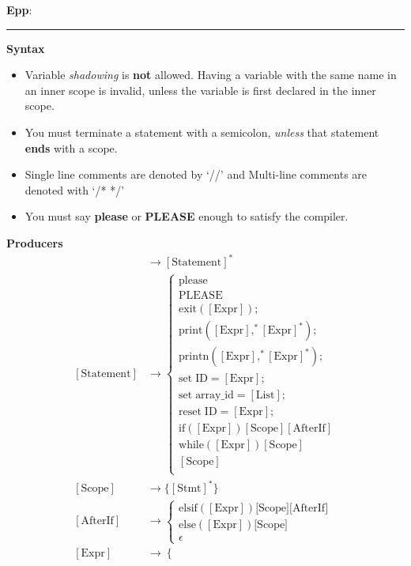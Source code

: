 \documentclass[11pt]{article}
\newcommand{\hwheadings}[3]{
{{\bf Epp}: \chapsec } \hfill {{ \yourname }} \hfill {{ \course #1}}
\rule[0.051in]{\textwidth}{0.0025in}
}
\begin{document}
\hwheadings{}{}{}
\textbf{Syntax}
\begin{itemize}
  \item Variable \textit{shadowing} is \textbf{not} allowed. Having a variable with the same name 
    in an inner scope is invalid, unless the variable is first 
    declared in the inner scope. 
  \item You must terminate a statement with a semicolon, \textit{unless} that 
    statement \textbf{ends} with a scope. 
  \item Single line comments are denoted by `//' and Multi-line comments are denoted with `/* */'
  \item You must say \textbf{please} or \textbf{PLEASE} enough to satisfy the compiler.
\end{itemize}
\textbf{Producers}
\begin{align*}
  [\text{Program}] &\to [\text{Statement}]^* \\
  [\text{Statement}] &\to 
  \begin{cases}
    \text{please} \\
    \text{PLEASE} \\
    \text{exit}([\text{Expr}]); \\ 
    \text{print}([\text{Expr}] ,^* [\text{Expr}]^*); \\ 
    \text{printn}([\text{Expr}] ,^* [\text{Expr}]^*); \\ 
    \text{set} \; \text{ID} = [\text{Expr}]; \\
    \text{set} \; \text{array\_id} = [\text{List}]; \\
    \text{reset} \; \text{ID} = [\text{Expr}]; \\
    \text{if} ([\text{Expr}])[\text{Scope}][\text{AfterIf}]  \\
    \text{while} ([\text{Expr}])[\text{Scope}] \\
    [\text{Scope}] \\
  \end{cases} \\
  [\text{Scope}] &\to \{[\text{Stmt}]^*\} \\
  [\text{AfterIf}] &\to 
  \begin{cases}
    \text{elsif}([\text{Expr}])\text{[Scope]}\text{[AfterIf]} \\
    \text{else}([\text{Expr}])\text{[Scope]} \\
    \epsilon
  \end{cases} \\
  [\text{Expr}] &\to 
  \begin{cases}

\end{cases}
\end{align*}
\end{document}
